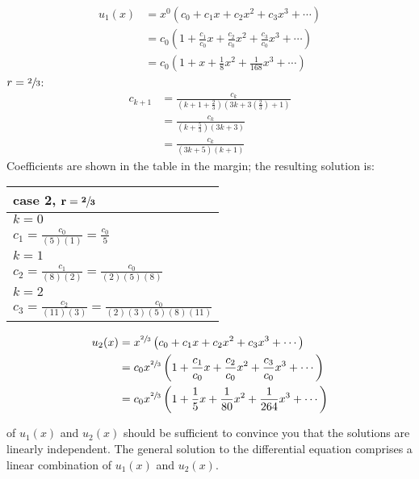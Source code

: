 \begin{align*}
u_1(x) &= x^0\left(c_0 + c_1x + c_2x^2 + c_3x^3 + \cdots \right) \\
&= c_0\left(1 + \frac{c_1}{c_0}x + \frac{c_2}{c_0}x^2 + \frac{c_3}{c_0}x^3 + \cdots \right) \\
&= c_0\left(1+x+\frac{1}{8}x^2+\frac{1}{168}x^3+\cdots \right)
\end{align*}
\vspace{0.25cm}
\noindent\underline{$r=\sfrac{2}{3}$}:
\begin{align*}
c_{k+1} &=\frac{c_k}{(k+1+\frac{2}{3})(3k+3\left(\frac{2}{3}\right)+1)}\\
&=\frac{c_k}{\left(k+\frac{5}{3}\right)(3k+3)} \\
&=\frac{c_k}{(3k+5)(k+1)}
\end{align*}
\noindent Coefficients are shown in the table in the margin; the resulting solution is:
\begin{margintable}
\begin{tabular}{|l|}
\hline
\textbf{case 2, } $\mathbf{r=\sfrac{2}{3}}$ \\\hline
$k=0$ \\
$c_1 = \frac{c_0}{(5)(1)} = \frac{c_0}{5}$ \\\hline
$k=1$ \\
$c_2 = \frac{c_1}{(8)(2)} = \frac{c_0}{(2)(5)(8)}$ \\\hline
$k=2$ \\
$c_3 = \frac{c_2}{(11)(3)} = \frac{c_0}{(2)(3)(5)(8)(11)}$\\\hline
\end{tabular}
\end{margintable}
\begin{align*}
u_2(x) &= x^{\sfrac{2}{3}}\left(c_0 + c_1x + c_2x^2 + c_3x^3 + \cdots \right) \\
&= c_0x^{\sfrac{2}{3}}\left(1 + \frac{c_1}{c_0}x+\frac{c_2}{c_0}x^2+\frac{c_3}{c_0}x^3 + \cdots \right) \\
&= c_0x^{\sfrac{2}{3}}\left(1+\frac{1}{5}x + \frac{1}{80}x^2+\frac{1}{264}x^3 + \cdots  \right)
\end{align*}

 of $u_1(x)$ and $u_2(x)$ should be sufficient to convince you that the solutions are linearly independent.  The general solution to the differential equation comprises a linear combination of $u_1(x)$ and $u_2(x)$.


